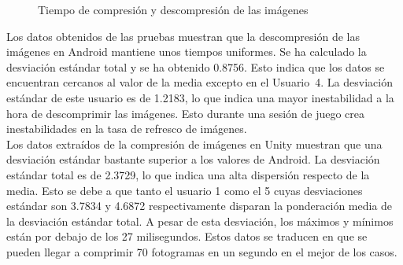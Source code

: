\begin{figure}[h]
     \hfill
	\caption{Tiempo de compresi\'on y descompresi\'on de las im\'agenes}
     \label{}
   \end{figure}



Los datos obtenidos de las pruebas muestran que la descompresi\'on de las im\'agenes en Android mantiene unos tiempos uniformes. Se ha calculado la desviaci\'on est\'andar total y se ha obtenido 0.8756. Esto indica que los datos se encuentran cercanos al valor de la media excepto en el Usuario~4. La desviaci\'on est\'andar de este usuario es de 1.2183, lo que indica una mayor inestabilidad a la hora de descomprimir las im\'agenes. Esto durante una sesi\'on de juego crea inestabilidades en la tasa de refresco de im\'agenes. \\

Los datos extra\'idos de la compresi\'on de im\'agenes en Unity muestran que una desviaci\'on est\'andar bastante superior a los valores de Android. La desviaci\'on est\'andar total es de 2.3729, lo que indica una alta dispersi\'on respecto de la media. Esto se debe a que tanto el usuario 1 como el 5 cuyas desviaciones est\'andar son 3.7834 y 4.6872 respectivamente disparan la ponderaci\'on media de la desviaci\'on est\'andar total. A pesar de esta desviaci\'on, los m\'aximos y m\'inimos est\'an por debajo de los 27 milisegundos.  Estos datos se traducen en que se pueden llegar a comprimir 70 fotogramas en un segundo en el mejor de los casos.\\



